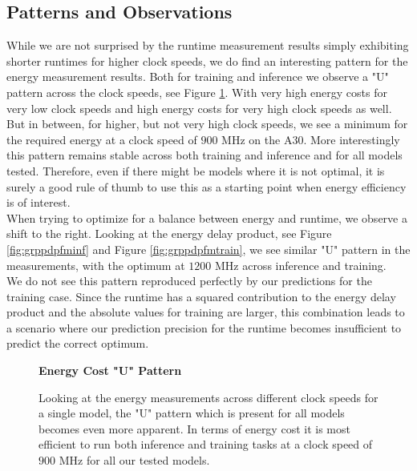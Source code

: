 \FloatBarrier

\subsection{Patterns and Observations}
While we are not surprised by the runtime measurement results simply exhibiting shorter runtimes for higher clock speeds, we do find an interesting pattern for the energy measurement results. Both for training and inference we observe a "U" pattern across the clock speeds, see Figure \ref{fig:pattern}. With very high energy costs for very low clock speeds and high energy costs for very high clock speeds as well. But in between, for higher, but not very high clock speeds, we see a minimum for the required energy at a clock speed of $900$ MHz on the A30. More interestingly this pattern remains stable across both training and inference and for all models tested. Therefore, even if there might be models where it is not optimal, it is surely a good rule of thumb to use this as a starting point when energy efficiency is of interest. \\
When trying to optimize for a balance between energy and runtime, we observe a shift to the right. Looking at the energy delay product, see Figure \ref{fig:grppdpfminf} and Figure \ref{fig:grppdpfmtrain}, we see similar "U" pattern in the measurements, with the optimum at $1200$ MHz across inference and training. \\
We do not see this pattern reproduced perfectly by our predictions for the training case. Since the runtime has a squared contribution to the energy delay product and the absolute values for training are larger, this combination leads to a scenario where our prediction precision for the runtime becomes insufficient to predict the correct optimum. 


\begin{figure}[htbp]
    \centering
    \parbox{0.7\textwidth}{\centering\textbf{Energy Cost "U" Pattern}}
    \caption{Looking at the energy measurements across different clock speeds for a single model, the "U" pattern which is present for all models becomes even more apparent. In terms of energy cost it is most efficient to run both inference and training tasks at a clock speed of $900$ MHz for all our tested models.}
    \label{fig:pattern}
\end{figure}

\FloatBarrier



